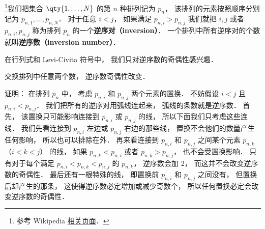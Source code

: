 
\begin{issues}
\issueDraft
\end{issues}


\footnote{参考 Wikipedia \href{https://en.wikipedia.org/wiki/Inversion_(discrete_mathematics)}{相关页面}．}我们把集合 $\qty{1,\dots,N}$ 的第 $n$ 种排列记为 $p_n$， 该排列的元素按照顺序分别记为 $p_{n,1}, \dots, p_{n,N}$． 对于任意 $i < j$， 如果满足 $p_{n,i} > p_{n,j}$ 我们就把 $i, j$ 或者 $p_{n,i}, p_{n,j}$ 称为排列 $p_n$ 的一个\textbf{逆序对（inversion）}． 一个排列中所有逆序对的个数就叫\textbf{逆序数（inversion number）}．

在行列式和 Levi-Civita 符号中， 我们只对逆序数的奇偶性感兴趣． 

\begin{theorem}{}
交换排列中任意两个数， 逆序数奇偶性改变． 
\end{theorem}

证明：
在排列 $p_n$ 中， 考虑 $p_{n,i}$ 和 $p_{n,j}$ 两个元素的置换． 不妨假设 $i < j$ 且 $p_{n,i} < p_{n,j}$． 我们把所有的逆序对用弧线连起来， 弧线的条数就是逆序数． 首先， 该置换只可能影响连接到 $p_{n,i}$ 或 $p_{n,j}$ 的线， 所以下面我们只考虑这些连线． 我们先看连接到 $p_{n,i}$ 左边或 $p_{n,j}$ 右边的那些线， 置换不会他们的数量产生任何影响， 所以也可以排除在外． 再来看连接到 $p_{n,i}$ 和 $p_{n,j}$ 之间某个元素 $p_{n, k}$ （$i < k < j$） 的线， 如果 $p_{n, k} < p_{n,i}$ 或者 $p_{n, k} > p_{n,j}$， 也不会受置换影响． 只有对于每个满足 $p_{n,i} < p_{n,k} < p_{n,j}$ 的 $p_{n,k}$， 逆序数会加 2， 而这并不会改变逆序数的奇偶性． 最后还有一根特殊的线， 即置换前 $p_{n,i}$ 和 $p_{n,j}$ 之间没有， 但置换后却产生的那条， 这使得逆序数必定增加或减少奇数个， 所以任何置换必定会改变逆序数的奇偶性．
